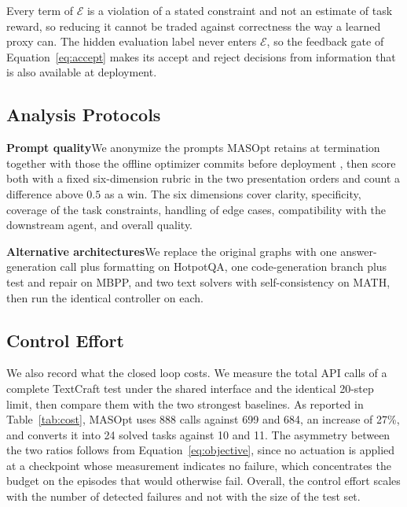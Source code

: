 \documentclass{article}
\theoremstyle{definition}
\begin{document}
Every term of $\mathcal{E}$ is a violation of a stated constraint and not an estimate of task reward, so reducing it cannot be traded against correctness the way a learned proxy can. The hidden evaluation label never enters $\mathcal{E}$, so the feedback gate of Equation~\ref{eq:accept} makes its accept and reject decisions from information that is also available at deployment.

\subsection{Analysis Protocols}
\label{app:analysis}

\textbf{Prompt quality}\quad We anonymize the prompts MASOpt retains at termination together with those the offline optimizer commits before deployment \citep{hong2026maspob}, then score both with a fixed six-dimension rubric in the two presentation orders and count a difference above $0.5$ as a win. The six dimensions cover clarity, specificity, coverage of the task constraints, handling of edge cases, compatibility with the downstream agent, and overall quality.

\textbf{Alternative architectures}\quad We replace the original graphs with one answer-generation call plus formatting on HotpotQA, one code-generation branch plus test and repair on MBPP, and two text solvers with self-consistency on MATH, then run the identical controller on each.

\subsection{Control Effort}
\label{app:cost}

We also record what the closed loop costs. We measure the total API calls of a complete TextCraft test under the shared interface and the identical 20-step limit, then compare them with the two strongest baselines. As reported in Table~\ref{tab:cost}, MASOpt uses 888 calls against 699 and 684, an increase of 27\%, and converts it into 24 solved tasks against 10 and 11. The asymmetry between the two ratios follows from Equation~\ref{eq:objective}, since no actuation is applied at a checkpoint whose measurement indicates no failure, which concentrates the budget on the episodes that would otherwise fail. Overall, the control effort scales with the number of detected failures and not with the size of the test set.
\end{document}
